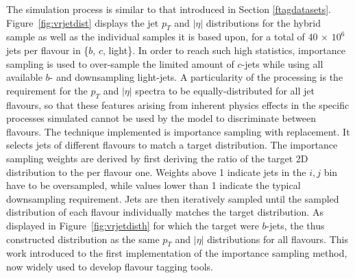 The simulation process is similar to that introduced in Section \ref{ftagdatasets}. Figure~\ref{fig:vrjetdist} displays the jet $p_T$ and $|\eta|$ distributions for the hybrid sample as well as the individual samples it is based upon, for a total of 40 $\times$ $10^6$ jets per flavour in \{$b$, $c$, light\}. In order to reach such high statistics, importance sampling is used to over-sample the limited amount of $c$-jets while using all available $b$- and downsampling light-jets. A particularity of the processing is the requirement for the $p_T$ and $|\eta|$ spectra to be equally-distributed for all jet flavours, so that these features arising from inherent physics effects in the specific processes simulated cannot be used by the model to discriminate between flavours. The technique implemented is importance sampling with replacement. It selects jets of different flavours to match a target distribution. The importance sampling weights are derived by first deriving the ratio of the target 2D distribution to the per flavour one. Weights above 1 indicate jets in the $i, j$ bin have to be oversampled, while values lower than 1 indicate the typical downsampling requirement. Jets are then iteratively sampled until the sampled distribution of each flavour individually matches the target distribution. As displayed in Figure~\ref{fig:vrjetdisth} for which the target were $b$-jets, the thus constructed distribution as the same $p_T$ and $|\eta|$ distributions for all flavours. This work introduced to the first implementation of the importance sampling method, now widely used to develop flavour tagging tools.  

